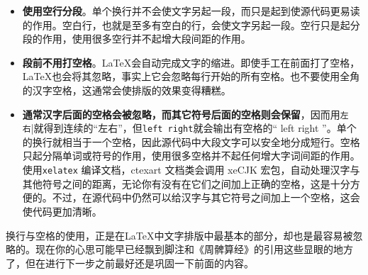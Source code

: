 \begin{itemize}
    \item \textbf{使用空行分段}。单个换行并不会使文字另起一段，而只是起到使源代码更易读的作用。空白行，也就是至多有空白的行，会使文字另起一段。空行只是起分段的作用，使用很多空行并不起增大段间距的作用。
    \item \textbf{段前不用打空格}。\LaTeX 会自动完成文字的缩进。即使手工在前面打了空格，\LaTeX 也会将其忽略，事实上它会忽略每行开始的所有空格。也不要使用全角的汉字空格，这通常会使排版的效果变得糟糕。
    \item \textbf{通常汉字后面的空格会被忽略，而其它符号后面的空格则会保留}，因而用\lstinline[showspaces=true]{左 右}|就得到连续的“左右”，但\lstinline[showspaces=true]{left right}就会输出有空格的“ left right ”。单个的换行就相当于一个空格，因此源代码中大段文字可以安全地分成短行。空格只起分隔单词或符号的作用，使用很多空格并不起任何增大字词间距的作用。使用\verb|xelatex| 编译文档，ctexart 文档类会调用 xeCJK 宏包，自动处理汉字与其他符号之间的距离，无论你有没有在它们之间加上正确的空格，这是十分方便的。不过，在源代码中仍然可以给汉字与其它符号之间加上一个空格，这会使代码更加清晰。
\end{itemize}

换行与空格的使用，正是在\LaTeX 中文字排版中最基本的部分，却也是最容易被忽略的。现在你的心思可能早已经飘到脚注和《周髀算经》的引用这些显眼的地方了，但在进行下一步之前最好还是巩固一下前面的内容。
